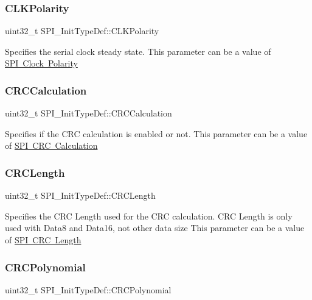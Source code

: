 \subsubsection{\texorpdfstring{CLKPolarity}{CLKPolarity}}
{\footnotesize\ttfamily uint32\+\_\+t S\+P\+I\+\_\+\+Init\+Type\+Def\+::\+C\+L\+K\+Polarity}

Specifies the serial clock steady state. This parameter can be a value of \mbox{\hyperlink{group___s_p_i___clock___polarity}{S\+PI Clock Polarity}} \mbox{\label{struct_s_p_i___init_type_def_a3472de9bd9247c1d97312aff7e58e385}} 
\subsubsection{\texorpdfstring{CRCCalculation}{CRCCalculation}}
{\footnotesize\ttfamily uint32\+\_\+t S\+P\+I\+\_\+\+Init\+Type\+Def\+::\+C\+R\+C\+Calculation}

Specifies if the C\+RC calculation is enabled or not. This parameter can be a value of \mbox{\hyperlink{group___s_p_i___c_r_c___calculation}{S\+PI C\+RC Calculation}} \mbox{\label{struct_s_p_i___init_type_def_ade3815f539adcdeba866ab26a5f59c99}} 
\subsubsection{\texorpdfstring{CRCLength}{CRCLength}}
{\footnotesize\ttfamily uint32\+\_\+t S\+P\+I\+\_\+\+Init\+Type\+Def\+::\+C\+R\+C\+Length}

Specifies the C\+RC Length used for the C\+RC calculation. C\+RC Length is only used with Data8 and Data16, not other data size This parameter can be a value of \mbox{\hyperlink{group___s_p_i___c_r_c__length}{S\+PI C\+RC Length}} \mbox{\label{struct_s_p_i___init_type_def_abdaf3ccbfa4ef68cc81fd32f29baa678}} 
\subsubsection{\texorpdfstring{CRCPolynomial}{CRCPolynomial}}
{\footnotesize\ttfamily uint32\+\_\+t S\+P\+I\+\_\+\+Init\+Type\+Def\+::\+C\+R\+C\+Polynomial}

